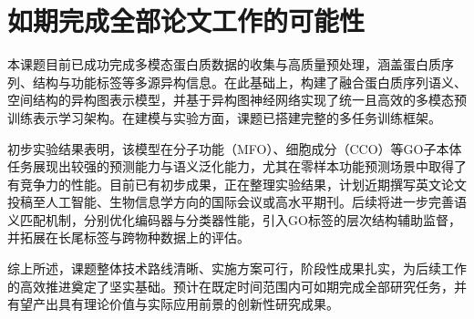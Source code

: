 
\chapter{如期完成全部论文工作的可能性}
本课题目前已成功完成多模态蛋白质数据的收集与高质量预处理，涵盖蛋白质序列、结构与功能标签等多源异构信息。在此基础上，构建了融合蛋白质序列语义、空间结构的异构图表示模型，并基于异构图神经网络实现了统一且高效的多模态预训练表示学习架构。在建模与实验方面，课题已搭建完整的多任务训练框架。

初步实验结果表明，该模型在分子功能（MFO）、细胞成分（CCO）等GO子本体任务展现出较强的预测能力与语义泛化能力，尤其在零样本功能预测场景中取得了有竞争力的性能。目前已有初步成果，正在整理实验结果，计划近期撰写英文论文投稿至人工智能、生物信息学方向的国际会议或高水平期刊。后续将进一步完善语义匹配机制，分别优化编码器与分类器性能，引入GO标签的层次结构辅助监督，并拓展在长尾标签与跨物种数据上的评估。

综上所述，课题整体技术路线清晰、实施方案可行，阶段性成果扎实，为后续工作的高效推进奠定了坚实基础。预计在既定时间范围内可如期完成全部研究任务，并有望产出具有理论价值与实际应用前景的创新性研究成果。


